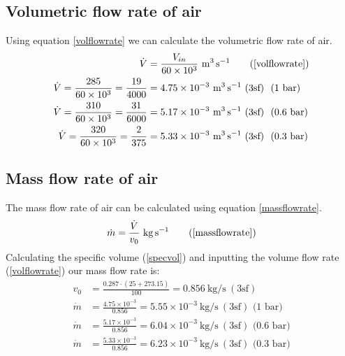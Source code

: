\documentclass[class=article, crop=false, 12pt,a4paper]{standalone}
\numberwithin{equation}{section}
\begin{document}
\subsection{Volumetric flow rate of air}
Using equation \ref{volflowrate} we can calculate the volumetric flow rate of air.
\begin{align}
  \dot{V} &= \frac{V_{in}}{60 \times 10^3} \ \si{\meter\cubed\per\second} \tag{\ref{volflowrate}}\\
  \dot{V} = \frac{285}{60\times 10^3} = \frac{19}{4000} &= 4.75 \times 10^{-3} \ \si{\meter\cubed\per\second} \ (3\textrm{sf}) \ \textrm{ (1 bar)}\\
  \dot{V} = \frac{310}{60\times 10^3} = \frac{31}{6000} &= 5.17 \times 10^{-3} \ \si{\meter\cubed\per\second} \ (3\textrm{sf}) \ \textrm{ (0.6 bar)}\\
  \dot{V} = \frac{320}{60\times 10^3} = \frac{2}{375} &= 5.33 \times 10^{-3} \ \si{\meter\cubed\per\second} \ (3\textrm{sf}) \ \textrm{ (0.3 bar)}
\end{align}
\subsection{Mass flow rate of air}
The mass flow rate of air can be calculated using equation \ref{massflowrate}.
\begin{equation}
  \dot{m} = \frac{\dot{V}}{v_0} \ \si{\kg\per\second}
  \tag{\ref{massflowrate}}
\end{equation}
Calculating the specific volume (\ref{specvol}) and inputting the volume flow rate (\ref{volflowrate}) our mass flow rate is:
\begin{align}
  v_0 &= \frac{0.287 \cdot (25+273.15)}{100} = 0.856 \ \si{\kg\per\second} \ (3\textrm{sf})  \\
  \dot{m} &= \frac{4.75 \times 10^{-3}}{0.856} = 5.55 \times 10^{-3} \ \si{\kg\per\second} \ (3\textrm{sf}) \textrm{ (1 bar)} \\
  \dot{m} &= \frac{5.17 \times 10^{-3}}{0.856} = 6.04 \times 10^{-3} \ \si{\kg\per\second} \ (3\textrm{sf}) \textrm{ (0.6 bar)} \\
  \dot{m} &= \frac{5.33 \times 10^{-3}}{0.856} = 6.23 \times 10^{-3} \ \si{\kg\per\second} \ (3\textrm{sf}) \textrm{ (0.3 bar)}
\end{align}
\end{document}

